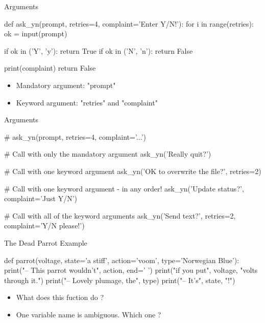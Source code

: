 \documentclass[serif, aspectratio=169]{beamer}
\begin{document}
\begin{frame}[fragile]{Arguments}
    \begin{pythoncode}
    def ask_yn(prompt, retries=4, complaint='Enter Y/N!'):
        for i in range(retries):
            ok = input(prompt)
        
            if ok in ('Y', 'y'):
                return True      
            if ok in ('N', 'n'):
                return False
        
        print(complaint)
        return False
    \end{pythoncode}
    \begin{itemize}
        \item Mandatory argument: "prompt"
        \item Keyword argument: "retries" and "complaint"
    \end{itemize}
\end{frame}

\begin{frame}[fragile]{Arguments}
    \begin{pythoncode}
    # ask_yn(prompt, retries=4, complaint='...')

    # Call with only the mandatory argument
    ask_yn('Really quit?')

    # Call with one keyword argument
    ask_yn('OK to overwrite the file?', retries=2)

    # Call with one keyword argument - in any order!
    ask_yn('Update status?', complaint='Just Y/N')

    # Call with all of the keyword arguments
    ask_yn('Send text?', retries=2, complaint='Y/N please!')
    \end{pythoncode}
\end{frame}

\begin{frame}[fragile]{The Dead Parrot Example}
    \begin{pythoncode}
    def parrot(voltage, state='a stiff', action='voom',
               type='Norwegian Blue'):
        print("-- This parrot wouldn't", action, end=' ')
        print("if you put", voltage, "volts through it.")
        print("-- Lovely plumage, the", type)
        print("-- It's", state, "!")
    \end{pythoncode}
    \begin{block}{}
        \begin{itemize}
            \item What does this fuction do ?
            \item One variable name is ambiguous. Which one ?
        \end{itemize}
    \end{block}
\end{frame}
\end{document}
